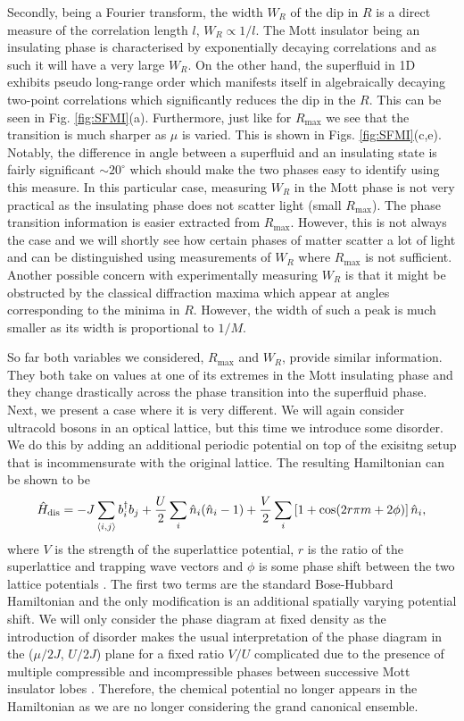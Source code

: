 Secondly, being a Fourier transform, the width $W_R$ of the dip in $R$
is a direct measure of the correlation length $l$, $W_R \propto
1/l$. The Mott insulator being an insulating phase is characterised by
exponentially decaying correlations and as such it will have a very
large $W_R$. On the other hand, the superfluid in 1D exhibits pseudo
long-range order which manifests itself in algebraically decaying
two-point correlations \cite{giamarchi} which significantly reduces
the dip in the $R$. This can be seen in
Fig. \ref{fig:SFMI}(a). Furthermore, just like for $R_\text{max}$ we
see that the transition is much sharper as $\mu$ is varied. This is
shown in Figs. \ref{fig:SFMI}(c,e). Notably, the difference in angle
between a superfluid and an insulating state is fairly significant
$\sim 20^\circ$ which should make the two phases easy to identify
using this measure. In this particular case, measuring $W_R$ in the
Mott phase is not very practical as the insulating phase does not
scatter light (small $R_\mathrm{max}$). The phase transition
information is easier extracted from $R_\mathrm{max}$. However, this
is not always the case and we will shortly see how certain phases of
matter scatter a lot of light and can be distinguished using
measurements of $W_R$ where $R_\mathrm{max}$ is not
sufficient. Another possible concern with experimentally measuring
$W_R$ is that it might be obstructed by the classical diffraction
maxima which appear at angles corresponding to the minima in
$R$. However, the width of such a peak is much smaller as its width is
proportional to $1/M$.

So far both variables we considered, $R_\text{max}$ and $W_R$, provide
similar information. They both take on values at one of its extremes
in the Mott insulating phase and they change drastically across the
phase transition into the superfluid phase. Next, we present a case
where it is very different. We will again consider ultracold bosons in
an optical lattice, but this time we introduce some disorder. We do
this by adding an additional periodic potential on top of the exisitng
setup that is incommensurate with the original lattice. The resulting
Hamiltonian can be shown to be
\begin{equation}
  \hat{H}_\mathrm{dis} = -J \sum_{\langle i, j \rangle}
  b^\dagger_i b_j + \frac{U}{2} \sum_i \hat{n}_i (\hat{n}_i - 1) +
  \frac{V}{2} \sum_i \left[ 1 + \cos (2 r \pi m + 2 \phi) \right]
  \hat{n}_i,
\end{equation}
where $V$ is the strength of the superlattice potential, $r$ is the
ratio of the superlattice and trapping wave vectors and $\phi$ is some
phase shift between the two lattice potentials \cite{roux2008}. The
first two terms are the standard Bose-Hubbard Hamiltonian and the only
modification is an additional spatially varying potential shift. We
will only consider the phase diagram at fixed density as the
introduction of disorder makes the usual interpretation of the phase
diagram in the ($\mu/2J$, $U/2J$) plane for a
fixed ratio $V/U$ complicated due to the presence of multiple
compressible and incompressible phases between successive Mott
insulator lobes \cite{roux2008}. Therefore, the chemical potential no
longer appears in the Hamiltonian as we are no longer considering the
grand canonical ensemble.

